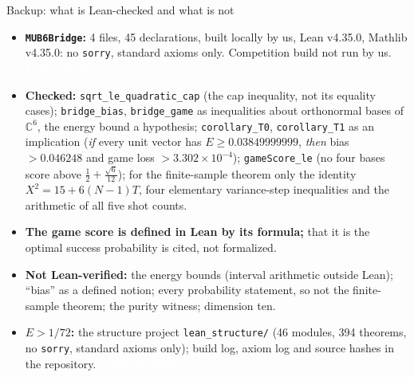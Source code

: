 \documentclass[aspectratio=169,11pt,t]{beamer}
\newcommand{\tg}[2]{{\setlength{\fboxsep}{1.2pt}\colorbox{#1}{\textcolor{white}{\sffamily\bfseries\footnotesize\,#2\,}}}}
\newcommand{\Tleanh}{\tg{cLeanH}{Lean-checked}}
\newcommand{\Tlean}{\tg{cLeanH}{Lean-checked}}
\newcommand{\C}{\mathbb{C}}
\begin{document}
\begin{frame}{Backup: what is Lean-checked and what is not}
\footnotesize
\begin{itemize}\setlength\itemsep{1pt}
\item \textbf{\texttt{MUB6Bridge}:} 4 files, 45 declarations, built locally by us, Lean v4.35.0, Mathlib v4.35.0: no \texttt{sorry}, standard axioms only. Competition build not run by us. \Tleanh
\item \textbf{Checked:} \texttt{sqrt\_le\_quadratic\_cap} (the cap inequality, not its equality cases); \texttt{bridge\_bias}, \texttt{bridge\_game} as inequalities about orthonormal bases of $\C^6$, the energy bound a hypothesis; \texttt{corollary\_T0}, \texttt{corollary\_T1} as an implication (\emph{if} every unit vector has $E\ge0.03849999999$, \emph{then} bias $>0.046248$ and game loss $>3.302\times10^{-4}$); \texttt{gameScore\_le} (no four bases score above $\tfrac12+\tfrac{\sqrt6}{12}$); for the finite-sample theorem only the identity $X^2=15+6(N-1)T$, four elementary variance-step inequalities and the arithmetic of all five shot counts.
\item \textbf{The game score is defined in Lean by its formula;} that it is the optimal success probability is cited, not formalized.
\item \textbf{Not Lean-verified:} the energy bounds (interval arithmetic outside Lean); ``bias'' as a defined notion; every probability statement, so not the finite-sample theorem; the purity witness; dimension ten.
\item \textbf{$E>1/72$:} the structure project \texttt{lean\_structure/} (46 modules, 394 theorems, no \texttt{sorry}, standard axioms only); build log, axiom log and source hashes in the repository. \Tlean
\end{itemize}
\end{frame}
\end{document}
